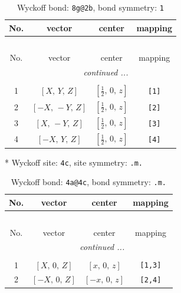 \documentclass[fleqn,8pt]{jsarticle}
\begin{document}
\begin{longtable}{cccc}
\caption{Wyckoff bond: {\tt 8g@2b}, bond symmetry: {\tt 1}}
 \\
 \hline \hline
No. & vector & center & mapping \\ \hline \endfirsthead

\multicolumn{3}{l}{\tablename\ \thetable{}} \\
 \hline \hline
No. & vector & center & mapping \\ \hline \endhead

 \hline \hline
\multicolumn{3}{r}{\footnotesize\it continued ...} \\ \endfoot

 \hline \hline
\multicolumn{3}{r}{} \\ \endlastfoot

1 & $\left[ X,\, Y,\, Z \right]$ & $\left[ \frac{1}{2},\, 0,\, z \right]$ & {\tt [1]} \\ \hline
2 & $\left[ - X,\, - Y,\, Z \right]$ & $\left[ \frac{1}{2},\, 0,\, z \right]$ & {\tt [2]} \\ \hline
3 & $\left[ X,\, - Y,\, Z \right]$ & $\left[ \frac{1}{2},\, 0,\, z \right]$ & {\tt [3]} \\ \hline
4 & $\left[ - X,\, Y,\, Z \right]$ & $\left[ \frac{1}{2},\, 0,\, z \right]$ & {\tt [4]} \\
\end{longtable}
* Wyckoff site: {\tt 4c}, site symmetry: {\tt .m.}
\renewcommand{\arraystretch}{1.2}
\begin{longtable}{cccc}
\caption{Wyckoff bond: {\tt 4a@4c}, bond symmetry: {\tt .m.}}
 \\
 \hline \hline
No. & vector & center & mapping \\ \hline \endfirsthead

\multicolumn{3}{l}{\tablename\ \thetable{}} \\
 \hline \hline
No. & vector & center & mapping \\ \hline \endhead

 \hline \hline
\multicolumn{3}{r}{\footnotesize\it continued ...} \\ \endfoot

 \hline \hline
\multicolumn{3}{r}{} \\ \endlastfoot

1 & $\left[ X,\, 0,\, Z \right]$ & $\left[ x,\, 0,\, z \right]$ & {\tt [1,3]} \\ \hline
2 & $\left[ - X,\, 0,\, Z \right]$ & $\left[ - x,\, 0,\, z \right]$ & {\tt [2,4]} \\
\end{longtable}
\end{document}
